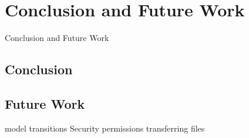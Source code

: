 \chapter{Conclusion and Future Work}
\label{ch:conclusion}

Conclusion and Future Work
\section{Conclusion}

\section {Future Work}
model transitions
Security
permissions
transferring files 

